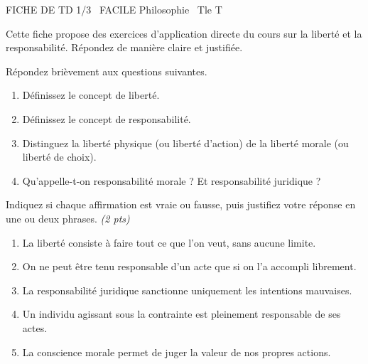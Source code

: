 \documentclass[11pt]{article}
\begin{document}
\begin{tcolorbox}[enhanced,colback=popink,colframe=popink,arc=10pt,boxrule=0pt,left=12pt,right=12pt,top=9pt,bottom=9pt]
{\color{white}\popxbold\small FICHE DE TD 1/3 \textbullet\ FACILE \hfill Philosophie \textbullet\ Tle T\par}
\end{tcolorbox}
\vspace{4pt}
Cette fiche propose des exercices d'application directe du cours sur la liberté et la responsabilité. Répondez de manière claire et justifiée.

\begin{exercice}
Répondez brièvement aux questions suivantes.
\begin{enumerate}
\item Définissez le concept de liberté.
\item Définissez le concept de responsabilité.
\item Distinguez la liberté physique (ou liberté d'action) de la liberté morale (ou liberté de choix).
\item Qu'appelle-t-on responsabilité morale ? Et responsabilité juridique ?
\end{enumerate}
\end{exercice}

\begin{exercice}
Indiquez si chaque affirmation est vraie ou fausse, puis justifiez votre réponse en une ou deux phrases. \textit{(2 pts)}
\begin{enumerate}
\item La liberté consiste à faire tout ce que l'on veut, sans aucune limite.
\item On ne peut être tenu responsable d'un acte que si on l'a accompli librement.
\item La responsabilité juridique sanctionne uniquement les intentions mauvaises.
\item Un individu agissant sous la contrainte est pleinement responsable de ses actes.
\item La conscience morale permet de juger la valeur de nos propres actions.
\end{enumerate}
\end{exercice}
\end{document}
